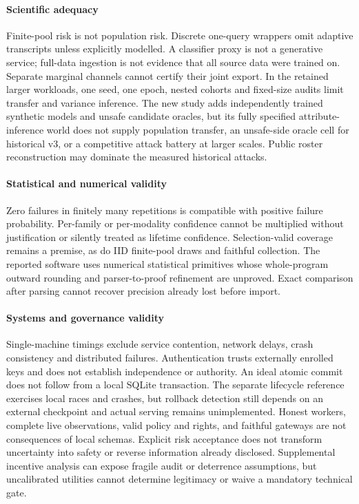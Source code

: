 \documentclass[conference,compsoc]{IEEEtran}
\begin{document}
\paragraph{Scientific adequacy}
Finite-pool risk is not population risk. Discrete one-query wrappers omit
adaptive transcripts unless explicitly modelled. A classifier proxy is not a
generative service; full-data ingestion is not evidence that all source data
were trained on. Separate marginal channels cannot certify their joint export.
In the retained larger workloads, one seed, one epoch, nested cohorts and
fixed-size audits limit transfer and variance inference. The new study adds
independently trained synthetic models and unsafe candidate oracles, but its
fully specified attribute-inference world does not supply population transfer,
an unsafe-side oracle cell for historical v3, or a competitive attack battery
at larger scales. Public roster reconstruction may dominate the measured
historical attacks.

\paragraph{Statistical and numerical validity}
Zero failures in finitely many repetitions is compatible with positive failure
probability. Per-family or per-modality confidence cannot be multiplied without
justification or silently treated as lifetime confidence. Selection-valid coverage remains a
premise, as do IID finite-pool draws and faithful collection. The reported
software uses numerical statistical primitives whose whole-program outward
rounding and parser-to-proof refinement are unproved. Exact comparison after
parsing cannot recover precision already lost before import.

\paragraph{Systems and governance validity}
Single-machine timings exclude service contention, network delays, crash
consistency and distributed failures. Authentication trusts externally enrolled
keys and does not establish independence or authority. An ideal atomic commit
does not follow from a local SQLite transaction. The separate lifecycle
reference exercises local races and crashes, but rollback detection still
depends on an external checkpoint and actual serving remains unimplemented.
Honest workers, complete live observations, valid policy and rights, and
faithful gateways are not consequences of local schemas. Explicit risk
acceptance does not transform uncertainty into safety or reverse information
already disclosed. Supplemental incentive analysis can expose fragile audit
or deterrence assumptions, but uncalibrated utilities cannot determine
legitimacy or waive a mandatory technical gate.
\end{document}
